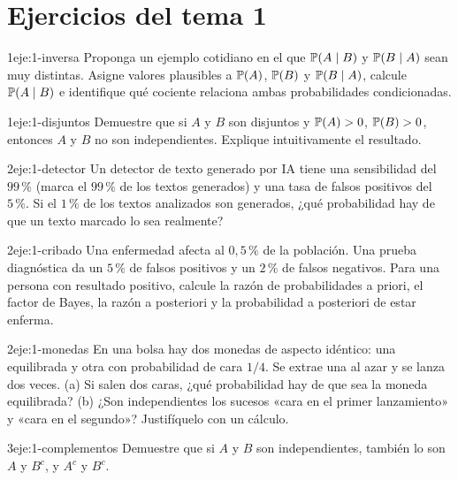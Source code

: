 \section*{Ejercicios del tema 1}

\begin{ejercicio}{1}{eje:1-inversa}
Proponga un ejemplo cotidiano en el que $\mathbb{P}(A\mid B)$ y $\mathbb{P}(B\mid A)$ sean muy distintas. Asigne valores plausibles a $\mathbb{P}(A)$, $\mathbb{P}(B)$ y $\mathbb{P}(B\mid A)$, calcule $\mathbb{P}(A\mid B)$ e identifique qué cociente relaciona ambas probabilidades condicionadas.
\end{ejercicio}

\begin{ejercicio}{1}{eje:1-disjuntos}
Demuestre que si $A$ y $B$ son disjuntos y $\mathbb{P}(A)>0$, $\mathbb{P}(B)>0$, entonces $A$ y $B$ no son independientes. Explique intuitivamente el resultado.
\end{ejercicio}

\begin{ejercicio}{2}{eje:1-detector}
Un detector de texto generado por IA tiene una sensibilidad del $99\,\%$ (marca el $99\,\%$ de los textos generados) y una tasa de falsos positivos del $5\,\%$. Si el $1\,\%$ de los textos analizados son generados, ¿qué probabilidad hay de que un texto marcado lo sea realmente?
\end{ejercicio}

\begin{ejercicio}{2}{eje:1-cribado}
Una enfermedad afecta al $0{,}5\,\%$ de la población. Una prueba diagnóstica da un $5\,\%$ de falsos positivos y un $2\,\%$ de falsos negativos. Para una persona con resultado positivo, calcule la razón de probabilidades a priori, el factor de Bayes, la razón a posteriori y la probabilidad a posteriori de estar enferma.
\end{ejercicio}

\begin{ejercicio}{2}{eje:1-monedas}
En una bolsa hay dos monedas de aspecto idéntico: una equilibrada y otra con probabilidad de cara $1/4$. Se extrae una al azar y se lanza dos veces. (a) Si salen dos caras, ¿qué probabilidad hay de que sea la moneda equilibrada? (b) ¿Son independientes los sucesos «cara en el primer lanzamiento» y «cara en el segundo»? Justifíquelo con un cálculo.
\end{ejercicio}

\begin{ejercicio}{3}{eje:1-complementos}
Demuestre que si $A$ y $B$ son independientes, también lo son $A$ y $B^{c}$, y $A^{c}$ y $B^{c}$.
\end{ejercicio}
